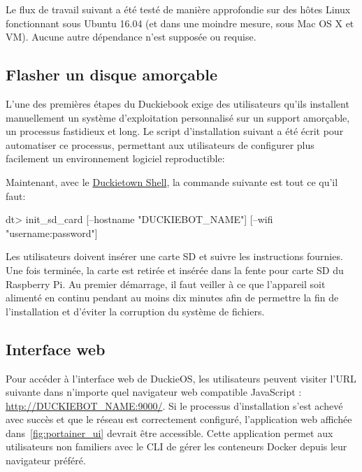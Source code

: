 \noindent Le flux de travail suivant a été testé de manière approfondie sur des hôtes Linux fonctionnant sous Ubuntu 16.04 (et dans une moindre mesure, sous Mac OS X et VM). Aucune autre dépendance n'est supposée ou requise.

\subsection{Flasher un disque amorçable}

L'une des premières étapes du Duckiebook exige des utilisateurs qu'ils installent manuellement un système d'exploitation personnalisé sur un support amorçable, un processus fastidieux et long. Le script d'installation suivant a été écrit pour automatiser ce processus, permettant aux utilisateurs de configurer plus facilement un environnement logiciel reproductible:

%
Maintenant, avec le \href{https://github.com/duckietown/duckietown-shell}{Duckietown Shell}, la commande suivante est tout ce qu'il faut:
%
\begin{dtslisting}
dt> init_sd_card [--hostname "DUCKIEBOT_NAME"] [--wifi "username:password"]
\end{dtslisting}
%
Les utilisateurs doivent insérer une carte SD et suivre les instructions fournies. Une fois terminée, la carte est retirée et insérée dans la fente pour carte SD du Raspberry Pi. Au premier démarrage, il faut veiller à ce que l'appareil soit alimenté en continu pendant au moins dix minutes afin de permettre la fin de l'installation et d'éviter la corruption du système de fichiers.

\subsection{Interface web}

Pour accéder à l'interface web de DuckieOS, les utilisateurs peuvent visiter l'URL suivante dans n'importe quel navigateur web compatible JavaScript : \url{http://DUCKIEBOT_NAME:9000/}. Si le processus d'installation s'est achevé avec succès et que le réseau est correctement configuré, l'application web affichée dans~\autoref{fig:portainer_ui} devrait être accessible. Cette application permet aux utilisateurs non familiers avec le CLI de gérer les conteneurs Docker depuis leur navigateur préféré.

